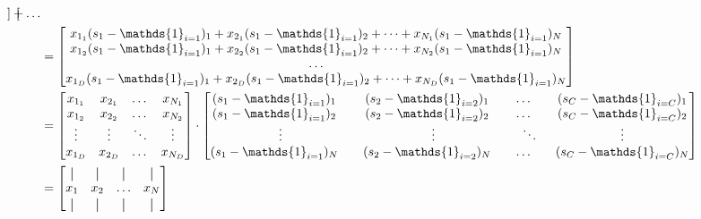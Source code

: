 \documentclass{article}
\newcommand*{\vertbar}{\rule[-1ex]{0.5pt}{2.5ex}}
\begin{document}
\begin{subequations}
\begin{equation}
\begin{aligned}[t]
\begin{bmatrix}
            \end{bmatrix} +
            \dots
            \\&=
            \begin{bmatrix}
                x_{1_{1}}(s_{1} - \mathds{1}_{i=1})_{1} + x_{2_{1}}(s_{1} - \mathds{1}_{i=1})_{2} + \dots + x_{N_{1}}(s_{1} - \mathds{1}_{i=1})_{N}\\
                x_{1_{2}}(s_{1} - \mathds{1}_{i=1})_{1} + x_{2_{2}}(s_{1} - \mathds{1}_{i=1})_{2} + \dots + x_{N_{2}}(s_{1} - \mathds{1}_{i=1})_{N}\\
                \dots\\
                x_{1_{D}}(s_{1} - \mathds{1}_{i=1})_{1} + x_{2_{D}}(s_{1} - \mathds{1}_{i=1})_{2} + \dots + x_{N_{D}}(s_{1} - \mathds{1}_{i=1})_{N}\\
            \end{bmatrix}\\ &=
            \begin{bmatrix}
                x_{1_{1}} & x_{2_{1}} & \dots & x_{N_{1}} \\
                x_{1_{2}} & x_{2_{2}} & \dots & x_{N_{2}} \\
                \vdots    & \vdots    & \ddots & \vdots \\
                x_{1_{D}} & x_{2_{D}} & \dots & x_{N_{D}} \\
            \end{bmatrix} \cdot
            \begin{bmatrix}
                (s_{1} - \mathds{1}_{i=1})_{1} \ \ \ & (s_{2} - \mathds{1}_{i=2})_{1} \ \ \ & \dots \ \ \ & (s_{C} - \mathds{1}_{i=C})_{1}\\
                (s_{1} - \mathds{1}_{i=1})_{2} \ \ \ & (s_{2} - \mathds{1}_{i=2})_{2} \ \ \ & \dots \ \ \ & (s_{C} - \mathds{1}_{i=C})_{2}\\
                \vdots    & \vdots    & \ddots & \vdots \\
                (s_{1} - \mathds{1}_{i=1})_{N} \ \ \ & (s_{2} - \mathds{1}_{i=2})_{N} \ \ \ & \dots \ \ \ & (s_{C} - \mathds{1}_{i=C})_{N}
            \end{bmatrix}\\ &=
            \begin{bmatrix}
                \vertbar & \vertbar & \vertbar & \vertbar \\
                x_{1}    & x_{2}    & \hdots & x_{N} \\
                \vertbar & \vertbar & \vertbar & \vertbar

\end{bmatrix}
\end{aligned}
\end{equation}
\end{subequations}
\end{document}
